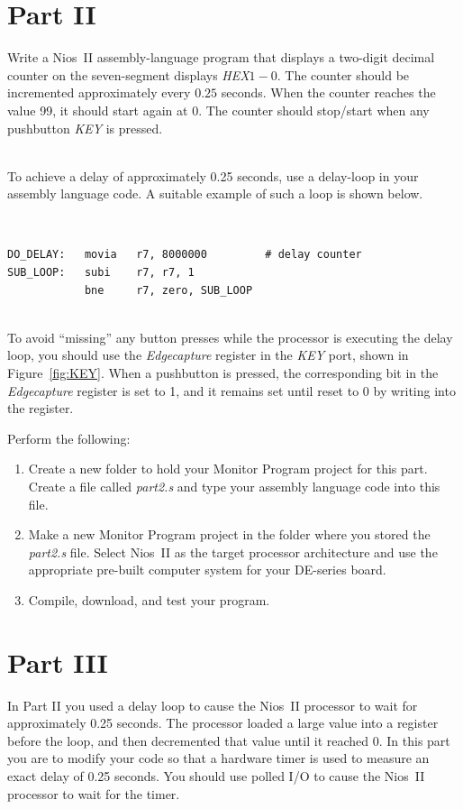\documentclass[epsfig,10pt,fullpage]{article}
\begin{document}
\section*{Part II}
Write a Nios~II assembly-language program that displays a two-digit decimal counter on the 
seven-segment displays {\it HEX}$1-0$. The counter should be incremented approximately
every $0.25$ seconds. When the counter reaches the value 99, it should start again at 0.
The counter should stop/start when any pushbutton {\it KEY} is pressed.

~\\
To achieve a delay of approximately 0.25 seconds, use a delay-loop in your assembly language
code. A suitable example of such a loop is shown below.

~\\
\begin{lstlisting}[style=defaultNiosStyle]
DO_DELAY: 	movia 	r7, 8000000 		# delay counter
SUB_LOOP: 	subi 	r7, r7, 1
			bne 	r7, zero, SUB_LOOP
\end{lstlisting}

~\\
To avoid ``missing'' any button presses while the processor is executing the delay loop, you
should use the {\it Edgecapture} register in the {\it KEY} port, shown in Figure~\ref{fig:KEY}.
When a pushbutton is pressed, the corresponding bit in the {\it Edgecapture} register is
set to 1, and it remains set until reset to 0 by writing into the register.


Perform the following:

\begin{enumerate}
\item Create a new folder to hold your Monitor Program project for this part. Create a
file called {\it part2.s} and type your assembly language code into this file.

\item
Make a new Monitor Program project in the folder where you stored the {\it part2.s}
file. Select Nios~II as the target processor architecture and use the appropriate pre-built 
computer system for your DE-series board.

\item
Compile, download, and test your program. 
\end{enumerate}

\section*{Part III}
In Part II you used a delay loop to cause the Nios~II processor to wait for approximately 0.25 
seconds. The processor loaded a large value into a register before the loop, and then 
decremented that value until it reached 0.  In this part you are to modify your code so that a
hardware timer is used to measure an exact delay of 0.25 seconds. You should use polled I/O to
cause the Nios~II processor to wait for the timer.
\end{document}
